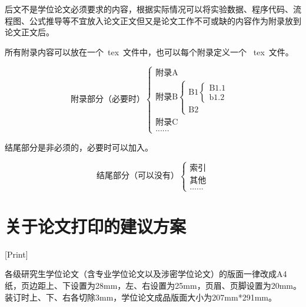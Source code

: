 后文不是学位论文必须要求的内容，根据实际情况可以将实验数据、程序代码、流程图、公式推导等不宜放入论文正文但又是论文工作不可或缺的内容作为附录放到论文正文后。

所有附录内容可以放在一个~tex~文件中，也可以每个附录定义一个 ~tex~文件。

\[
  \text{附录部分（必要时）}
  \begin{cases}
    \text{附录A}               \\
    \text{附录B}
    \begin{cases}
      \text{B1}
      \begin{cases}
        \text{B1.1} \\
        \text{b1.2}
      \end{cases} \\
      \text{B2}
    \end{cases} \\
    \text{附录C}               \\
    \text{......}
  \end{cases}
\]

结尾部分是非必须的，必要时可以加入。

\[
  \text{结尾部分（可以没有）}
  \begin{cases}
    \text{索引} \\
    \text{其他} \\
    \text{......}
  \end{cases}
\]

\chapter{关于论文打印的建议方案}[Print]

各级研究生学位论文（含专业学位论文以及涉密学位论文）的版面一律改成A4纸，页边距上、下设置为28mm，左、右设置为25mm，页眉、页脚设置为20mm。装订时上、下、右各切除3mm，学位论文成品版面大小为207mm*291mm。

